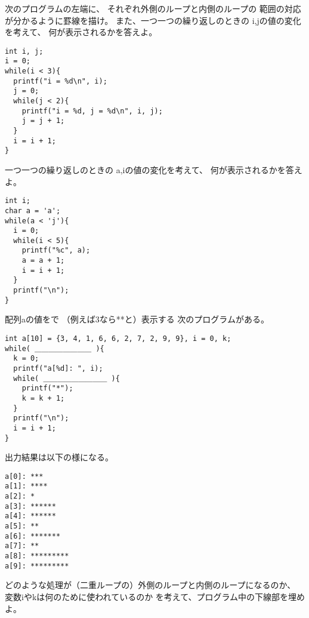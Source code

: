\documentclass[12pt,a4j]{jarticle}
\newcounter{toi}
\def\toi{%
\bigskip\bigskip\noindent
\addtocounter{toi}{1}
\shadowbox{\bfseries\large 問\thetoi}
\nopagebreak[4]\bigskip\nopagebreak[4]
}
\begin{document}
\toi


次のプログラムの左端に、
それぞれ外側のループと内側のループの
範囲の対応が分かるように罫線を描け。
また、一つ一つの繰り返しのときの
{\ttfamily i,j}の値の変化を考えて、
何が表示されるかを答えよ。

\begin{verbatim}
int i, j;
i = 0;
while(i < 3){
  printf("i = %d\n", i);
  j = 0;
  while(j < 2){
    printf("i = %d, j = %d\n", i, j);
    j = j + 1;
  }
  i = i + 1;
}
\end{verbatim}









\toi

一つ一つの繰り返しのときの
{\ttfamily a,i}の値の変化を考えて、
何が表示されるかを答えよ。

\begin{verbatim}
int i;
char a = 'a';
while(a < 'j'){
  i = 0;
  while(i < 5){
    printf("%c", a);
    a = a + 1;
    i = i + 1;
  }
  printf("\n");
}
\end{verbatim}








\toi
\label{toi:histgram}

配列{\ttfamily a}の値を{\ttfamily *}で
（例えば3なら{\ttfamily ***}と）表示する
次のプログラムがある。

\begin{verbatim}
int a[10] = {3, 4, 1, 6, 6, 2, 7, 2, 9, 9}, i = 0, k;
while( ＿＿＿＿＿＿＿＿ ){
  k = 0;
  printf("a[%d]: ", i);
  while( ＿＿＿＿＿＿＿＿＿ ){
    printf("*");
    k = k + 1;
  }
  printf("\n");
  i = i + 1;
}
\end{verbatim}
出力結果は以下の様になる。
\begin{verbatim}
a[0]: ***
a[1]: ****
a[2]: *
a[3]: ******
a[4]: ******
a[5]: **
a[6]: *******
a[7]: **
a[8]: *********
a[9]: *********
\end{verbatim}
どのような処理が（二重ループの）外側のループと内側のループになるのか、
変数{\ttfamily iやk}は何のために使われているのか
を考えて、プログラム中の下線部を埋めよ。
\end{document}
